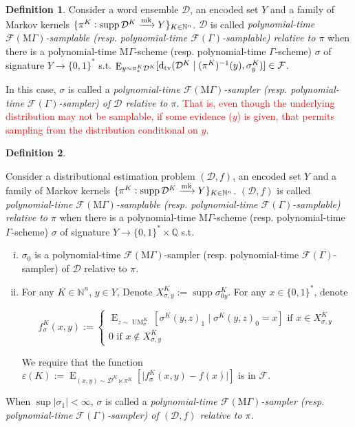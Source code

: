 \documentclass[11pt]{article}
\numberwithin{equation}{section}
\theoremstyle{definition}
\newtheorem{definition}{Definition}[section]
\theoremstyle{plain}
\newcommand{\Bool}{\{0,1\}}
\newcommand{\Words}{{\Bool^*}}
\DeclareMathOperator{\Supp}{supp}
\DeclareMathOperator{\E}{E}
\DeclareMathOperator{\UM}{UM}
\newcommand{\Dtv}{\operatorname{d}_{\textnormal{tv}}}
\newcommand{\Nats}{\mathbb{N}}
\newcommand{\Rats}{\mathbb{Q}}
\newcommand{\Abs}[1]{\lvert #1 \rvert}
\newcommand{\Dist}{\mathcal{D}}
\newcommand{\MGrow}{\mathrm{M}\Gamma}
\newcommand{\Fall}{\mathcal{F}}
\newcommand{\EG}{\Fall(\Gamma)}
\newcommand{\EMG}{\Fall(\MGrow)}
\newcommand{\Markov}{\xrightarrow{\textnormal{mk}}}
\begin{document}
\begin{definition}

Consider a word ensemble $\Dist$, an encoded set $Y$ and a family of Markov kernels ${\{\pi^K: \Supp \Dist^{K} \Markov Y\}_{K \in \Nats^n}}$. $\Dist$ is called \emph{polynomial-time $\EMG$-samplable (resp. polynomial-time $\EG$-samplable) relative to $\pi$} when there is a polynomial-time $\MGrow$-scheme (resp. polynomial-time $\Gamma$-scheme) $\sigma$ of signature $Y \rightarrow \Words$ s.t. ${\E_{y \sim \pi_*^K\Dist^{K}}[\Dtv(\Dist^K \mid (\pi^K)^{-1}(y),\sigma_y^K)] \in \Fall}$.

In this case, $\sigma$ is called a \emph{polynomial-time $\EMG$-sampler (resp. polynomial-time $\EG$-sampler) of $\Dist$ relative to $\pi$}. \textcolor{red}{That is, even though the underlying distribution may not be samplable, if some evidence ($y$) is given, that permits sampling from the distribution conditional on $y$.}

\end{definition}

\begin{samepage}
\begin{definition}
\label{def:smp_prob_rel}

Consider a distributional estimation problem $(\Dist,f)$, an encoded set $Y$ and a family of Markov kernels $\{\pi^K: \Supp \Dist^{K} \Markov Y\}_{K \in \Nats^n}$. $(\Dist,f)$ is called \emph{polynomial-time $\EMG$-samplable (resp. polynomial-time $\EG$-samplable) relative to $\pi$} when there is a polynomial-time $\MGrow$-scheme (resp. polynomial-time $\Gamma$-scheme) $\sigma$ of signature $Y \rightarrow \Words \times \Rats$ s.t.

\begin{enumerate}[(i)]

\item $\sigma_0$ is a polynomial-time $\EMG$-sampler (resp. polynomial-time $\EG$-sampler) of $\Dist$ relative to $\pi$.

\item For any $K \in \Nats^n$, $y \in Y$, Denote $X_{\sigma,y}^K:=\Supp \sigma_{0y}^K$. For any ${x \in \Words}$, denote 

$$f_\sigma^K(x,y):=\begin{cases}\E_{z \sim\UM_\sigma^K}[\sigma^K(y,z)_1 \mid \sigma^K(y,z)_0 = x] \text{ if } x \in X_{\sigma,y}^K \\ 0 \text{ if } x \not\in X_{\sigma,y}^K \end{cases}$$

We require that the function ${\varepsilon(K):=\E_{(x,y) \sim \Dist^{K} \ltimes \pi^K}[\Abs{f_\sigma^K(x,y)-f(x)}]}$ is in $\Fall$.

\end{enumerate}

When $\sup{\Abs{\sigma_1}} < \infty$, $\sigma$ is called a \emph{polynomial-time $\EMG$-sampler (resp. polynomial-time $\EG$-sampler) of $(\Dist,f)$ relative to $\pi$}.

\end{definition}
\end{samepage}
\end{document}
